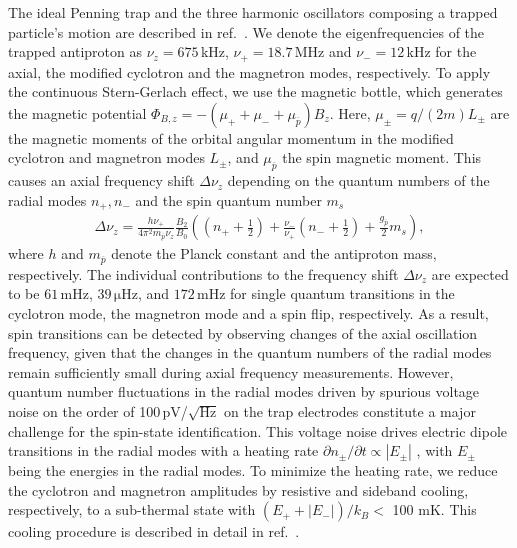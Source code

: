 \documentclass[12pt,preprint%
]{elsarticle}
\begin{document}
The ideal Penning trap and the three harmonic oscillators composing a trapped particle's motion are described in ref.~\cite{Brown}. We denote the eigenfrequencies of the trapped antiproton as $\nu_z = 675\,$kHz, $\nu_+ = 18.7\,$MHz and $\nu_- = 12\,$kHz for the axial, the modified cyclotron and the magnetron modes, respectively.
To apply the continuous Stern-Gerlach effect, we use the magnetic bottle, which generates the magnetic potential $\Phi_{B,z} = - (\mu_+ + \mu_- + \mu_{\overline{p}}) B_z$. Here, $\mu_\pm = q/(2 m) L_{\pm}$ are the magnetic moments of the orbital angular momentum in the modified cyclotron and magnetron modes $L_{\pm}$, and $\mu_{\overline{p}}$ the spin magnetic moment. This causes an axial frequency shift $\Delta\nu_z$ depending on the quantum numbers of the radial modes $n_+, n_-$ and the spin quantum number $m_s$
\begin{eqnarray}
\Delta\nu_z = \frac{h \nu_+}{4 \pi^2 m_{\overline{p}} \nu_z} \frac{B_2}{B_0} %
\left( 
\left(n_+ + \frac{1}{2}\right) + 
\frac{\nu_-}{\nu_+}\left(n_- + \frac{1}{2}\right)+\frac{g_{\overline{p}}}{2}m_s \right),
\end{eqnarray}
where $h$ and $m_{\overline{p}}$ denote the Planck constant and the antiproton mass, respectively. The individual contributions to the frequency shift $\Delta\nu_z$ are expected to be $61\,$mHz, $39\,\mathrm{\mu}$Hz, and $172\,$mHz for single quantum transitions in the cyclotron mode, the magnetron mode and a spin flip, respectively. As a  result, spin transitions can be detected by observing changes of the axial oscillation frequency, given that the changes in the quantum numbers of the radial modes remain sufficiently small during axial frequency measurements. However, quantum number fluctuations in the radial modes driven by spurious voltage noise on the order of 100$\,$pV/$\sqrt{\mathrm{Hz}}$ on the trap electrodes constitute a major challenge for the spin-state identification. This voltage noise drives electric dipole transitions in the radial modes with a heating rate $\partial n_\pm/\partial t \propto |E_\pm|$ \cite{MooserPLB2013}, with $E_\pm$ being the energies in the radial modes. To minimize the heating rate, we reduce the cyclotron and magnetron amplitudes by resistive and sideband cooling, respectively, to a sub-thermal state with $(E_+ + |E_-|)/k_B <$ 100 mK. 
This cooling procedure is described in detail in ref.~\cite{MooserPLB2013}. 
\end{document}
